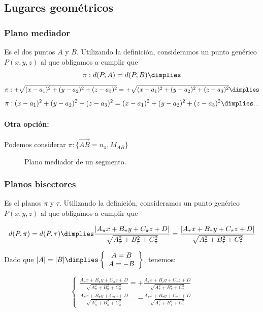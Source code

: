 \subsection{Lugares geométricos}


\subsubsection{Plano mediador}

Es el \lgdlp dos puntos $A$ y $B$. Utilizando la definición, consideramos un punto genérico $P(x,y,z)$ al que obligamos a cumplir que 
\[\pi: d(P,A) = d(P,B) \dimplies\]
\[\pi: +\sqrt{(x-a_1)^2+(y-a_2)^2+(z-a_3)^2} = +\sqrt{(x-a_1)^2+(y-a_2)^2+(z-a_3)^2} \dimplies\]
\[\pi: (x-a_1)^2+(y-a_2)^2+(z-a_3)^2 = (x-a_1)^2+(y-a_2)^2+(z-a_3)^2\dimplies ...\]

\paragraph{Otra opción: } Podemos considerar $\pi:\{\vec{AB} = n_{\pi}, M_{AB}\}$ 

\begin{figure}[H]
\centering
{}

\caption{Plano mediador de un segmento.}
\label{fig::plano-mediador}
\end{figure}



\subsubsection{Planos bisectores}

Es el  planos $\pi$ y $\tau$. 
%
Utilizando la definición, consideramos un punto genérico $P(x,y,z)$ al que obligamos a cumplir que 

\[d(P,\pi) = d(P,\tau) \dimplies \frac{|A_{\pi}x + B_{\pi}y+C_{\pi}z+D|}{\sqrt{A_{\pi}^2+B_{\pi}^2+C_{\pi}^2}} =  \frac{|A_{\tau}x + B_{\tau}y+C_{\tau}z+D|}{\sqrt{A_{\tau}^2+B_{\tau}^2+C_{\tau}^2}}\]

Dado que $|A| = |B| \dimplies \left\{\begin{array}{c}A=B\\A=-B\end{array}\right\}$, tenemos:

\[
\begin{cases}
\displaystyle\frac{A_{\pi}x + B_{\pi}y+C_{\pi}z+D}{\sqrt{A_{\pi}^2+B_{\pi}^2+C_{\pi}^2}} =  +\frac{A_{\tau}x + B_{\tau}y+C_{\tau}z+D}{\sqrt{A_{\tau}^2+B_{\tau}^2+C_{\tau}^2}}
\\
\displaystyle\frac{A_{\pi}x + B_{\pi}y+C_{\pi}z+D}{\sqrt{A_{\pi}^2+B_{\pi}^2+C_{\pi}^2}} = - \frac{A_{\tau}x + B_{\tau}y+C_{\tau}z+D}{\sqrt{A_{\tau}^2+B_{\tau}^2+C_{\tau}^2}}
\end{cases}
\]

